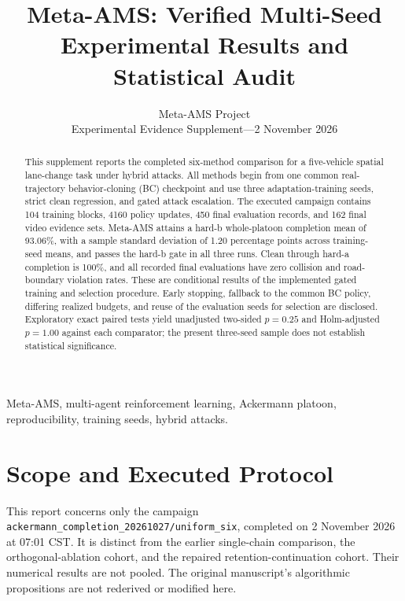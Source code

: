 \documentclass[lettersize,journal]{IEEEtran}
\begin{document}
\title{Meta-AMS: Verified Multi-Seed Experimental Results and Statistical Audit}
\author{Meta-AMS Project\\Experimental Evidence Supplement---2 November 2026}
\maketitle

\begin{abstract}
This supplement reports the completed six-method comparison for a five-vehicle spatial lane-change task under hybrid attacks. All methods begin from one common real-trajectory behavior-cloning (BC) checkpoint and use three adaptation-training seeds, strict clean regression, and gated attack escalation. The executed campaign contains 104 training blocks, 4160 policy updates, 450 final evaluation records, and 162 final video evidence sets. Meta-AMS attains a hard-b whole-platoon completion mean of 93.06\%, with a sample standard deviation of 1.20 percentage points across training-seed means, and passes the hard-b gate in all three runs. Clean through hard-a completion is 100\%, and all recorded final evaluations have zero collision and road-boundary violation rates. These are conditional results of the implemented gated training and selection procedure. Early stopping, fallback to the common BC policy, differing realized budgets, and reuse of the evaluation seeds for selection are disclosed. Exploratory exact paired tests yield unadjusted two-sided $p=0.25$ and Holm-adjusted $p=1.00$ against each comparator; the present three-seed sample does not establish statistical significance.
\end{abstract}

\begin{IEEEkeywords}
Meta-AMS, multi-agent reinforcement learning, Ackermann platoon, reproducibility, training seeds, hybrid attacks.
\end{IEEEkeywords}

\section{Scope and Executed Protocol}
This report concerns only the campaign \texttt{ackermann\_completion\_20261027/uniform\_six}, completed on 2 November 2026 at 07:01 CST. It is distinct from the earlier single-chain comparison, the orthogonal-ablation cohort, and the repaired retention-continuation cohort. Their numerical results are not pooled. The original manuscript's algorithmic propositions are not rederived or modified here.
\end{document}
